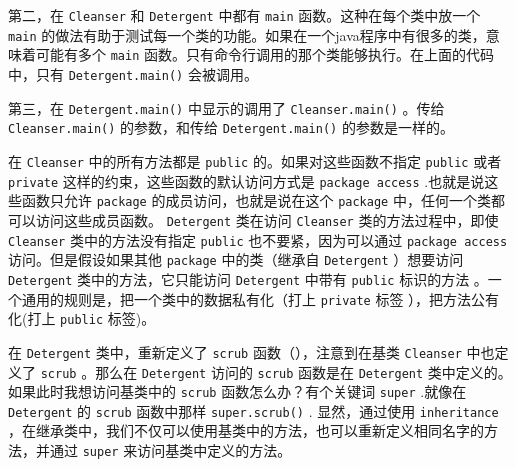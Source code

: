 \documentclass[10pt,a4paper,UTF8]{article}
\begin{document}
第二，在 \texttt{Cleanser} 和 \texttt{Detergent} 中都有 \texttt{main} 函数。这种在每个类中放一个 \texttt{main} 的做法有助于测试每一个类的功能。如果在一个java程序中有很多的类，意味着可能有多个 \texttt{main} 函数。只有命令行调用的那个类能够执行。在上面的代码中，只有 \texttt{Detergent.main()} 会被调用。

第三，在 \texttt{Detergent.main()} 中显示的调用了 \texttt{Cleanser.main()} 。传给 \texttt{Cleanser.main()} 的参数，和传给 \texttt{Detergent.main()} 的参数是一样的。

在 \texttt{Cleanser} 中的所有方法都是 \texttt{public} 的。如果对这些函数不指定 \texttt{public} 或者 \texttt{private} 这样的约束，这些函数的默认访问方式是 \texttt{package access} .也就是说这些函数只允许 \texttt{package} 的成员访问，也就是说在这个 \texttt{package} 中，任何一个类都可以访问这些成员函数。 \texttt{Detergent} 类在访问 \texttt{Cleanser} 类的方法过程中，即使 \texttt{Cleanser} 类中的方法没有指定 \texttt{public} 也不要紧，因为可以通过 \texttt{package access} 访问。但是假设如果其他 \texttt{package} 中的类（继承自 \texttt{Detergent} ）想要访问 \texttt{Detergent} 类中的方法，它只能访问 \texttt{Detergent} 中带有 \texttt{public} 标识的方法 。一个通用的规则是，把一个类中的数据私有化（打上 \texttt{private} 标签 ），把方法公有化(打上 \texttt{public} 标签)。

在 \texttt{Detergent} 类中，重新定义了 \texttt{scrub} 函数（），注意到在基类 \texttt{Cleanser} 中也定义了 \texttt{scrub} 。那么在 \texttt{Detergent} 访问的 \texttt{scrub} 函数是在 \texttt{Detergent} 类中定义的。如果此时我想访问基类中的 \texttt{scrub} 函数怎么办？有个关键词 \texttt{super} .就像在 \texttt{Detergent} 的 \texttt{scrub} 函数中那样 \texttt{super.scrub()} . 显然，通过使用 \texttt{inheritance} ，在继承类中，我们不仅可以使用基类中的方法，也可以重新定义相同名字的方法，并通过 \texttt{super} 来访问基类中定义的方法。
\end{document}
